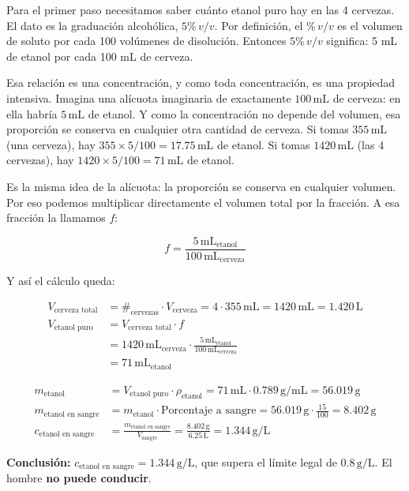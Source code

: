 \begin{exercise}{}{}
Para el primer paso necesitamos saber cuánto etanol puro hay en las 4 cervezas. 
El dato es la graduación alcohólica, $5\%\,v/v$. Por definición, el $\%\,v/v$ 
es el volumen de soluto por cada 100 volúmenes de disolución. Entonces $5\%\,v/v$ 
significa: 5 mL de etanol por cada 100 mL de cerveza.

Esa relación es una concentración, y como toda concentración, es una propiedad 
intensiva. Imagina una alícuota imaginaria de exactamente $100\,\mathrm{mL}$ de 
cerveza: en ella habría $5\,\mathrm{mL}$ de etanol. Y como la concentración no 
depende del volumen, esa proporción se conserva en cualquier otra cantidad de 
cerveza. Si tomas $355\,\mathrm{mL}$ (una cerveza), hay 
$355 \times 5/100 = 17.75\,\mathrm{mL}$ de etanol. Si tomas $1420\,\mathrm{mL}$ 
(las 4 cervezas), hay $1420 \times 5/100 = 71\,\mathrm{mL}$ de etanol.

Es la misma idea de la alícuota: la proporción se conserva en cualquier volumen. 
Por eso podemos multiplicar directamente el volumen total por la fracción. A esa 
fracción la llamamos \(f\):

\[
f = \frac{5\,\mathrm{mL}_{\text{etanol}}}{100\,\mathrm{mL}_{\text{cerveza}}}
\]

Y así el cálculo queda:

\begin{align*}
    V_{\text{cerveza total}} &= \#_{\text{cervezas}} \cdot V_{\text{cerveza}}
    = 4 \cdot 355\,\mathrm{mL} 
    = 1420\,\mathrm{mL} = 1.420\,\mathrm{L} \\[4pt]
    V_{\text{etanol puro}} &= V_{\text{cerveza total}} \cdot f \\[4pt]
    &= 1420\,\mathrm{mL}_{\text{cerveza}} \cdot 
    \frac{5\,\mathrm{mL}_{\text{etanol}}}{100\,\mathrm{mL}_{\text{cerveza}}} \\[4pt]
    &= 71\,\mathrm{mL}_{\text{etanol}}
\end{align*}

\begin{align*}
    m_{\text{etanol}} &= V_{\text{etanol puro}} \cdot \rho_{\text{etanol}}
    = 71\,\mathrm{mL} \cdot 0.789\,\mathrm{g/mL}
    = 56.019\,\mathrm{g} \\[4pt]
    m_{\text{etanol en sangre}} &= m_{\text{etanol}} \cdot 
    \text{Porcentaje a sangre}
    = 56.019\,\mathrm{g} \cdot \frac{15}{100}
    = 8.402\,\mathrm{g} \\[4pt]
    c_{\text{etanol en sangre}} &= \frac{m_{\text{etanol en sangre}}}{V_{\text{sangre}}}
    = \frac{8.402\,\mathrm{g}}{6.25\,\mathrm{L}}
    = 1.344\,\mathrm{g/L}
\end{align*}

\textbf{Conclusión:} $c_{\text{etanol en sangre}} = 1.344\,\mathrm{g/L}$, que 
supera el límite legal de $0.8\,\mathrm{g/L}$. El hombre \textbf{no puede 
conducir}.
\end{exercise}

